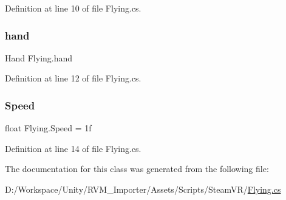 Definition at line 10 of file Flying.\+cs.

\mbox{\label{class_flying_a7fd7c0cc8163fec9302c8a4a3a8e7190}} 
\subsubsection{\texorpdfstring{hand}{hand}}
{\footnotesize\ttfamily Hand Flying.\+hand}



Definition at line 12 of file Flying.\+cs.

\mbox{\label{class_flying_ad0aaba54151449abeb89a6d285fb5ce1}} 
\subsubsection{\texorpdfstring{Speed}{Speed}}
{\footnotesize\ttfamily float Flying.\+Speed = 1f}



Definition at line 14 of file Flying.\+cs.



The documentation for this class was generated from the following file\+:\begin{DoxyCompactItemize}
\item 
D\+:/\+Workspace/\+Unity/\+R\+V\+M\+\_\+\+Importer/\+Assets/\+Scripts/\+Steam\+V\+R/\mbox{\hyperlink{_flying_8cs}{Flying.\+cs}}\end{DoxyCompactItemize}
